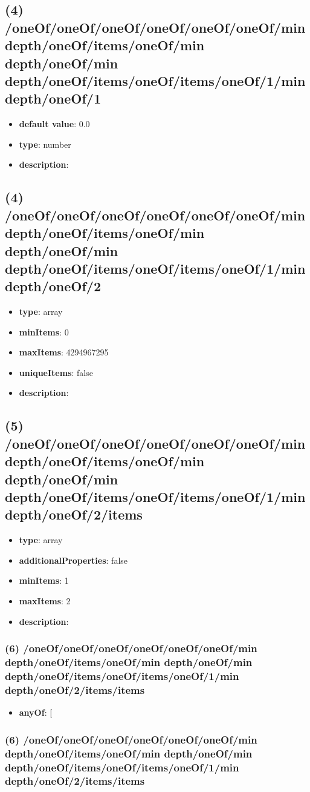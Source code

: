 \subsection{(4) /oneOf/oneOf/oneOf/oneOf/oneOf/oneOf/min depth/oneOf/items/oneOf/min depth/oneOf/min depth/oneOf/items/oneOf/items/oneOf/1/min depth/oneOf/1}
\begin{itemize}[leftmargin=4em]\item {\bf default value}: 0.0
\item {\bf type}: number
\item {\bf description}: 
\end{itemize}\subsection{(4) /oneOf/oneOf/oneOf/oneOf/oneOf/oneOf/min depth/oneOf/items/oneOf/min depth/oneOf/min depth/oneOf/items/oneOf/items/oneOf/1/min depth/oneOf/2}
\begin{itemize}[leftmargin=4em]\item {\bf type}: array
\item {\bf minItems}: 0
\item {\bf maxItems}: 4294967295
\item {\bf uniqueItems}: false
\item {\bf description}: 
\end{itemize}\subsection{(5) /oneOf/oneOf/oneOf/oneOf/oneOf/oneOf/min depth/oneOf/items/oneOf/min depth/oneOf/min depth/oneOf/items/oneOf/items/oneOf/1/min depth/oneOf/2/items}
\begin{itemize}[leftmargin=5em]\item {\bf type}: array
\item {\bf additionalProperties}: false
\item {\bf minItems}: 1
\item {\bf maxItems}: 2
\item {\bf description}: 
\end{itemize}\subsubsection{(6) /oneOf/oneOf/oneOf/oneOf/oneOf/oneOf/min depth/oneOf/items/oneOf/min depth/oneOf/min depth/oneOf/items/oneOf/items/oneOf/1/min depth/oneOf/2/items/items}
\begin{itemize}[leftmargin=6em]\item {\bf anyOf}: [\end{itemize}\subsubsection{(6) /oneOf/oneOf/oneOf/oneOf/oneOf/oneOf/min depth/oneOf/items/oneOf/min depth/oneOf/min depth/oneOf/items/oneOf/items/oneOf/1/min depth/oneOf/2/items/items}
